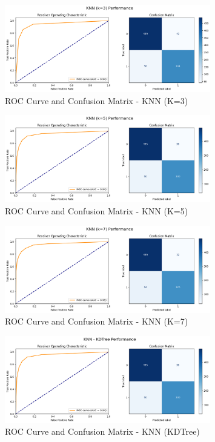 \documentclass[12pt]{article}
\begin{document}
\begin{figure}[h!]
\centering
\includegraphics[width=0.8\textwidth]{images/knn2.png}
\caption{ROC Curve and Confusion Matrix - KNN (K=3)}
\end{figure}

\begin{figure}[h!]
\centering
\includegraphics[width=0.8\textwidth]{images/knn3.png}
\caption{ROC Curve and Confusion Matrix - KNN (K=5)}
\end{figure}

\begin{figure}[h!]
\centering
\includegraphics[width=0.8\textwidth]{images/knn4.png}
\caption{ROC Curve and Confusion Matrix - KNN (K=7)}
\end{figure}

\begin{figure}[h!]
\centering
\includegraphics[width=0.8\textwidth]{images/knn5.png}
\caption{ROC Curve and Confusion Matrix - KNN (KDTree)}
\end{figure}
\end{document}
